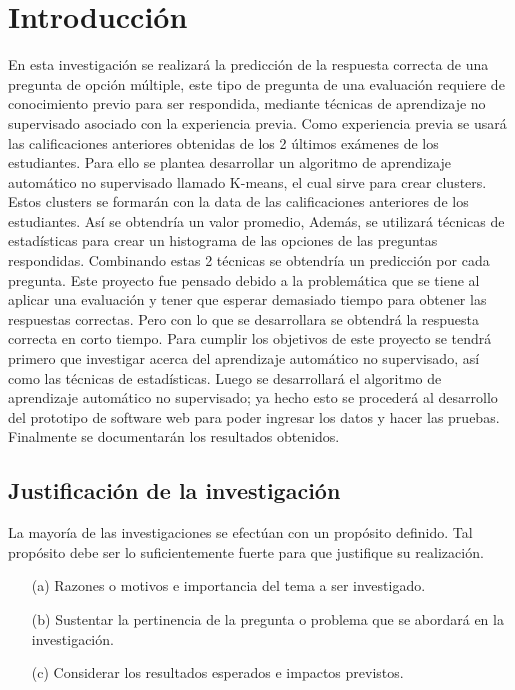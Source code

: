 \chapter{Introducción}
\setcounter{page}{1}
 
En esta investigación se realizará la predicción de la respuesta correcta de una pregunta de opción múltiple, este tipo de pregunta de una evaluación requiere de conocimiento previo para ser respondida, mediante técnicas de aprendizaje no supervisado asociado con la experiencia previa. Como experiencia previa se usará las calificaciones anteriores obtenidas de los 2 últimos exámenes de los estudiantes.
\vskip 0.3cm
Para ello se plantea desarrollar un algoritmo de aprendizaje automático no supervisado llamado K-means, el cual sirve para crear clusters. Estos clusters se formarán con la data de las calificaciones  anteriores  de  los  estudiantes. Así  se  obtendría  un  valor  promedio,  Además,  se utilizará técnicas de estadísticas para crear un histograma de las opciones de las preguntas respondidas. Combinando estas 2 técnicas se obtendría un predicción por cada pregunta.
\vskip 0.3cm  
Este proyecto fue pensado debido a la problemática que se tiene al aplicar una evaluación y tener que esperar demasiado tiempo para obtener las respuestas correctas. Pero con lo que se desarrollara se obtendrá la respuesta correcta en corto tiempo.
\vskip 0.3cm 
Para cumplir los objetivos de este proyecto se tendrá primero que investigar acerca del aprendizaje automático no supervisado, así como las técnicas de estadísticas. Luego se desarrollará el algoritmo de aprendizaje automático no supervisado; ya hecho esto se procederá al desarrollo del prototipo de software web para poder ingresar los datos y hacer las pruebas. Finalmente se documentarán los resultados obtenidos.

\section{Justificación de la investigación}
La mayoría de las investigaciones se efectúan con un propósito definido. Tal propósito debe ser lo suficientemente fuerte para que justifique su realización. \cite{Erica}  

\begin{enumerate}
\item[(a)] Razones o motivos e importancia del tema a ser investigado. 
\item[(b)]Sustentar la pertinencia de la pregunta o problema que se abordará en la investigación.
\item[(c)]Considerar los resultados esperados e impactos previstos.
\end{enumerate}




